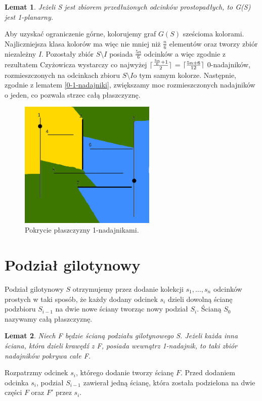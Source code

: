 \documentclass[brudnopis]{xmgr}
\DeclarePairedDelimiter\ceil{\lceil}{\rceil}
\newtheorem{Lemat}{Lemat} \theoremstyle{definition}
\begin{document}
\begin{Lemat}
  Jeżeli S jest zbiorem przedłużonych odcinków prostopadłych, to G(S) jest \textit{1-planarny}.
\end{Lemat}

\indent Aby uzyskać ograniczenie górne, kolorujemy graf $G(S)$ sześcioma kolorami. Najliczniejsza klasa kolorów ma więc nie mniej niż $\frac{n}{6}$ elementów oraz tworzy zbiór niezależny $I$. Pozostały zbiór $S \setminus I$ posiada $\frac{5n}{6}$ odcinków a więc zgodnie z rezultatem Czyżowicza wystarczy co najwyżej $\ceil{\frac{\frac{5n}{6} + 1}{2}}$ = $\ceil{\frac{5n+6}{12}}$ 0-nadajników, rozmieszczonych na odcinkach zbioru $S \setminus I$o tym samym kolorze. Następnie, zgodnie z lematem \ref{0-1-nadajniki}, zwiększamy moc rozmieszczonych nadajników o jeden, co pozwala strzec całą płaszczyznę.
\begin{figure}[ht!]
  \centering
  \includegraphics[width=6.5cm]{rysunki/pokrycie_nadajnikami.png}
  \caption{Pokrycie płaszczyzny 1-nadajnikami.}
  \label{fig:pokrycie plaszczyzny}
\end{figure} 

\section{Podział gilotynowy}
Podział gilotynowy $S$ otrzymujemy przez dodanie kolekcji $s_1,\ldots,s_n$ odcinków prostych w taki sposób, że każdy dodany odcinek $s_i$ dzieli dowolną ścianę podzbioru $S_{i-1}$ na dwie nowe ściany tworząc nowy podział $S_i$. Ścianą $S_0$ nazywamy całą płaszczyznę.

\begin{Lemat}\label{sasiednie sciany strzega F}
  Niech F będzie ścianą podziału gilotynowego S. Jeżeli każda inna ściana, która dzieli krawędź z F, posiada wewnątrz 1-nadajnik, to taki zbiór nadajników pokrywa całe F.
\end{Lemat}
\indent Rozpatrzmy odcinek $s_i$, którego dodanie tworzy ścianę $F$. Przed dodaniem odcinka $s_i$, podział $S_{i-1}$ zawierał jedną ścianę, która została podzielona na dwie części $F$ oraz $F'$ przez $s_i$. 
\end{document}

